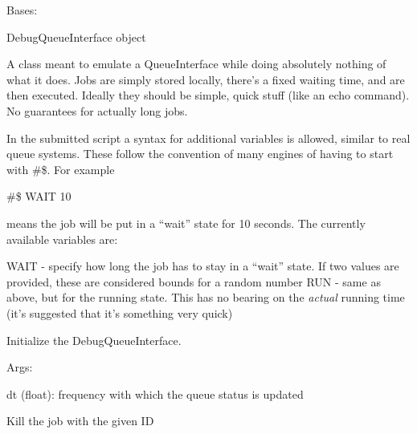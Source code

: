 \documentclass[letterpaper,10pt,english]{sphinxmanual}
\begin{document}
\begin{fulllineitems}
\label{doctree/soprano.hpc.submitter.debug.debugqueue:soprano.hpc.submitter.debug.debugqueue.DebugQueueInterface}
Bases: {\hyperref[doctree/soprano.hpc.submitter.queues:soprano.hpc.submitter.queues.QueueInterface]{}}

DebugQueueInterface object

A class meant to emulate a QueueInterface while doing absolutely nothing
of what it does. Jobs are simply stored locally, there's a fixed waiting
time, and are then executed. Ideally they should be simple, quick stuff
(like an echo command). No guarantees for actually long jobs.

In the submitted script a syntax for additional variables is allowed,
similar to real queue systems. These follow the convention of many engines
of having to start with \#\$. For example

\#\$ WAIT 10

means the job will be put in a ``wait'' state for 10 seconds. The currently
available variables are:

WAIT - specify how long the job has to stay in a ``wait'' state. If two
values are provided, these are considered bounds for a random number
RUN - same as above, but for the running state. This has no bearing on the
\emph{actual} running time (it's suggested that it's something very quick)

Initialize the DebugQueueInterface.

\begin{DUlineblock}{0em}
\item[] Args:
\item[]
\begin{DUlineblock}{\DUlineblockindent}
\item[] dt (float): frequency with which the queue status is updated
\end{DUlineblock}
\end{DUlineblock}

\begin{fulllineitems}
\label{doctree/soprano.hpc.submitter.debug.debugqueue:soprano.hpc.submitter.debug.debugqueue.DebugQueueInterface.kill}
Kill the job with the given ID


\end{fulllineitems}
\end{fulllineitems}
\end{document}
